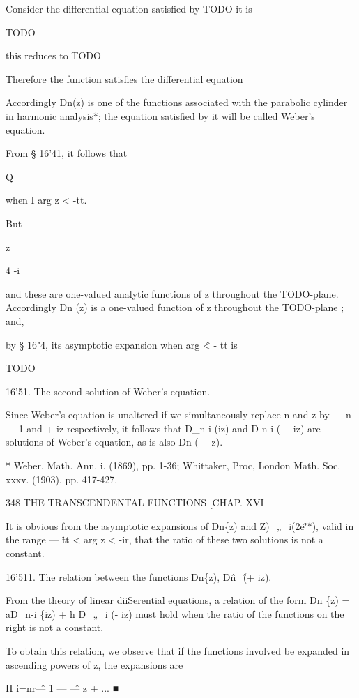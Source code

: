 
Consider the differential equation satisfied by TODO it is

TODO

this reduces to TODO

Therefore the function satisfies the differential equation

Accordingly Dn(z) is one of the functions associated with the
parabolic cylinder in harmonic analysis*; the equation satisfied by it
will be called Weber's equation.

From § 16'41, it follows that

Q

when I arg z < -tt.

But

z

4 -i

and these are one-valued analytic functions of z throughout the
TODO-plane. Accordingly Dn (z) is a one-valued function of z
throughout the TODO-plane ; and,

by § 16"4, its asymptotic expansion when arg \^ < - tt is

TODO

16'51. The second solution of Weber's equation.

Since Weber's equation is unaltered if we simultaneously replace n and
z by — n — 1 and + iz respectively, it follows that D\_n-i (iz) and
D-n-i (— iz) are solutions of Weber's equation, as is also Dn (— z).

* Weber, Math. Ann. i. (1869), pp. 1-36; Whittaker, Proc, London Math.
Soc. xxxv. (1903), pp. 417-427.

348 THE TRANSCENDENTAL FUNCTIONS [CHAP. XVI

It is obvious from the asymptotic expansions of Dn\{z) and
Z)\_„\_i(2e\^'\^*), valid in the range — \^ tt < arg z < -ir, that the
ratio of these two solutions is not a constant.

16'511. The relation between the functions Dn\{z), D\^n\_\^ (+ iz).

From the theory of linear diiSerential equations, a relation of the
form Dn \{z) = aD\_n-i \{iz) + h D\_„\_i (- iz) must hold when the
ratio of the functions on the right is not a constant.

To obtain this relation, we observe that if the functions involved be
expanded in ascending powers of z, the expansions are

H i=nr\^ — 1 — \^ — z + ... ■

